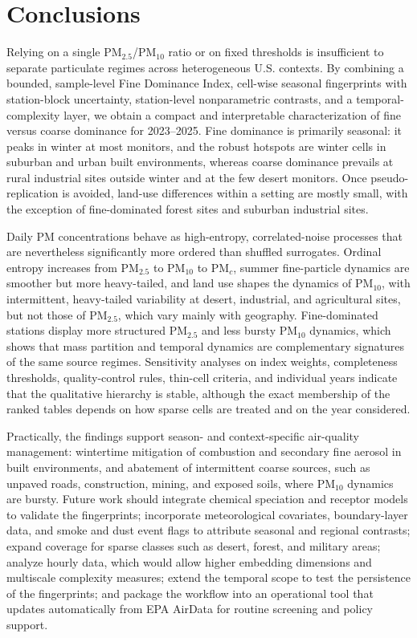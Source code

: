 \documentclass[a4paper,fleqn]{cas-sc}
\begin{document}
\section{Conclusions}\label{sec:conclusions}

Relying on a single PM$_{2.5}$/PM$_{10}$ ratio or on fixed thresholds is insufficient to separate particulate regimes across heterogeneous U.S. contexts. By combining a bounded, sample-level Fine Dominance Index, cell-wise seasonal fingerprints with station-block uncertainty, station-level nonparametric contrasts, and a temporal-complexity layer, we obtain a compact and interpretable characterization of fine versus coarse dominance for 2023--2025. Fine dominance is primarily seasonal: it peaks in winter at most monitors, and the robust hotspots are winter cells in suburban and urban built environments, whereas coarse dominance prevails at rural industrial sites outside winter and at the few desert monitors. Once pseudo-replication is avoided, land-use differences within a setting are mostly small, with the exception of fine-dominated forest sites and suburban industrial sites.

Daily PM concentrations behave as high-entropy, correlated-noise processes that are nevertheless significantly more ordered than shuffled surrogates. Ordinal entropy increases from PM$_{2.5}$ to PM$_{10}$ to PM$_{c}$, summer fine-particle dynamics are smoother but more heavy-tailed, and land use shapes the dynamics of PM$_{10}$, with intermittent, heavy-tailed variability at desert, industrial, and agricultural sites, but not those of PM$_{2.5}$, which vary mainly with geography. Fine-dominated stations display more structured PM$_{2.5}$ and less bursty PM$_{10}$ dynamics, which shows that mass partition and temporal dynamics are complementary signatures of the same source regimes. Sensitivity analyses on index weights, completeness thresholds, quality-control rules, thin-cell criteria, and individual years indicate that the qualitative hierarchy is stable, although the exact membership of the ranked tables depends on how sparse cells are treated and on the year considered.

Practically, the findings support season- and context-specific air-quality management: wintertime mitigation of combustion and secondary fine aerosol in built environments, and abatement of intermittent coarse sources, such as unpaved roads, construction, mining, and exposed soils, where PM$_{10}$ dynamics are bursty. Future work should integrate chemical speciation and receptor models to validate the fingerprints; incorporate meteorological covariates, boundary-layer data, and smoke and dust event flags to attribute seasonal and regional contrasts; expand coverage for sparse classes such as desert, forest, and military areas; analyze hourly data, which would allow higher embedding dimensions and multiscale complexity measures; extend the temporal scope to test the persistence of the fingerprints; and package the workflow into an operational tool that updates automatically from EPA AirData for routine screening and policy support.
\end{document}
